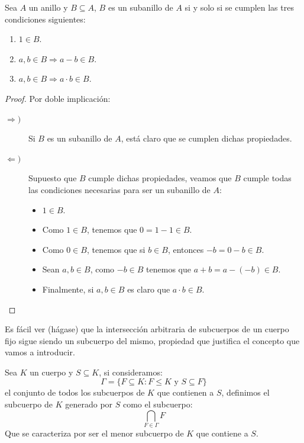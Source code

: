 \begin{prop}
    Sea $A$ un anillo y $B\subseteq A$, $B$ es un subanillo de $A$ si y solo si se cumplen las tres condiciones siguientes:
    \begin{enumerate}
        \item $1\in B$.
        \item $a,b\in B \Longrightarrow a-b\in B$.
        \item $a,b\in B \Longrightarrow a\cdot b\in B$.
    \end{enumerate}
    \begin{proof}
        Por doble implicación:
        \begin{description}
            \item [$\Longrightarrow )$] Si $B$ es un subanillo de $A$, está claro que se cumplen dichas propiedades.
            \item [$\Longleftarrow )$] Supuesto que $B$ cumple dichas propiedades, veamos que $B$ cumple todas las condiciones necesarias para ser un subanillo de $A$:
                \begin{itemize}
                    \item $1\in B$.
                    \item Como $1\in B$, tenemos que $0 = 1 -1 \in B$.
                    \item Como $0\in B$, tenemos que si $b\in B$, entonces $-b = 0-b\in B$.
                    \item Sean $a,b\in B$, como $-b\in B$ tenemos que $a+b = a-(-b)\in B$.
                    \item Finalmente, si $a,b\in B$ es claro que $a\cdot b\in B$.
                \end{itemize}
        \end{description}
    \end{proof}
\end{prop}

\noindent
Es fácil ver (hágase) que la intersección arbitraria de subcuerpos de un cuerpo fijo sigue siendo un subcuerpo del mismo, propiedad que justifica el concepto que vamos a introducir.

\begin{definicion}
    Sea $K$ un cuerpo y $S\subseteq K$, si consideramos:
    \begin{equation*}
        \Gamma = \{F\subseteq K : F\leq K \text{\ y\ } S\subseteq F\}
    \end{equation*}
    el conjunto de todos los subcuerpos de $K$ que contienen a $S$, definimos el subcuerpo de $K$ generado por $S$ como el subcuerpo:
    \begin{equation*}
        \bigcap_{F\in \Gamma} F
    \end{equation*}
    Que se caracteriza por ser el menor subcuerpo de $K$ que contiene a $S$.
\end{definicion}

